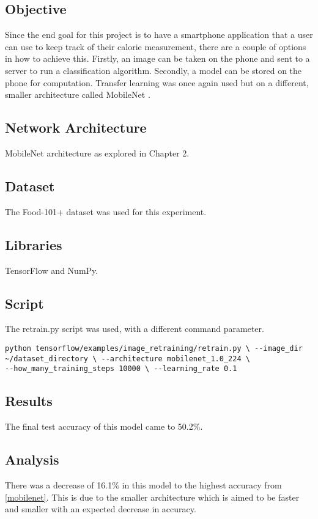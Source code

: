 \subsection*{Objective}
Since the end goal for this project is to have a smartphone
application that a user can use to keep track of their calorie measurement,
there are a couple of options in how to achieve this. Firstly, an image can be
taken on the phone and sent to a server to run a classification algorithm.
Secondly, a model can be stored on the phone for computation. Transfer learning was once again used but on a different, smaller architecture called MobileNet \parencite{mobilenet}.

\subsection*{Network Architecture}
MobileNet architecture as explored in Chapter 2.

\subsection*{Dataset}
The Food-101+ dataset was used for this experiment.

\subsection*{Libraries}
TensorFlow and NumPy.

\subsection*{Script}
The retrain.py script \parencite{retrainInception} was used, with a different
command parameter.

\begin{lstlisting}[style=Command]
python tensorflow/examples/image_retraining/retrain.py \ --image_dir
~/dataset_directory \ --architecture mobilenet_1.0_224 \
--how_many_training_steps 10000 \ --learning_rate 0.1
\end{lstlisting}

\subsection*{Results}
The final test accuracy of this model came to 50.2\%.

\subsection*{Analysis}
There was a decrease of 16.1\% in this model to the highest accuracy from
\ref{mobilenet}. This is due to the smaller architecture which is aimed to be faster
and smaller with an expected decrease in accuracy.
